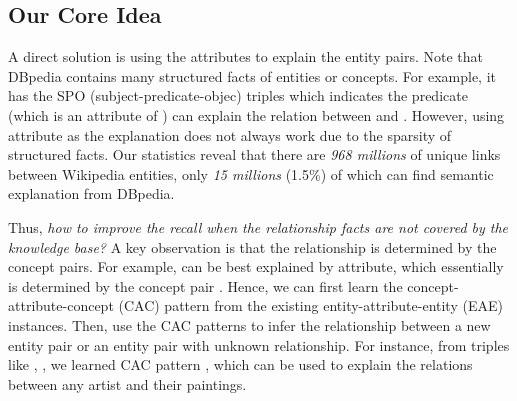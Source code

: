 \subsection{Our Core Idea}
A direct solution is using the attributes to explain the entity pairs. 
Note that DBpedia contains many structured facts of entities or concepts.
For example, it has the SPO (subject-predicate-objec) triples  which indicates the predicate  (which is an attribute of ) can explain the relation between  and .
However, using attribute as the explanation does not always work due to the sparsity of structured facts. 
Our statistics reveal that there are \emph{968 millions} of unique links between Wikipedia entities, only \emph{15 millions} (1.5\%) of which can find semantic explanation from DBpedia.


Thus, {\it how to improve the recall when the relationship facts are not covered by the knowledge base?} 
A key observation is that the relationship is determined by the concept pairs. For example,  can be best explained by  attribute, which essentially is determined by the concept pair . Hence, we can first learn the concept-attribute-concept (CAC) pattern from the existing entity-attribute-entity (EAE) instances. Then, use the CAC patterns to infer the relationship between a new entity pair or an entity pair with unknown relationship.
For instance, from triples like , , we learned CAC pattern , which can be used to explain the  relations between any artist and their paintings.

